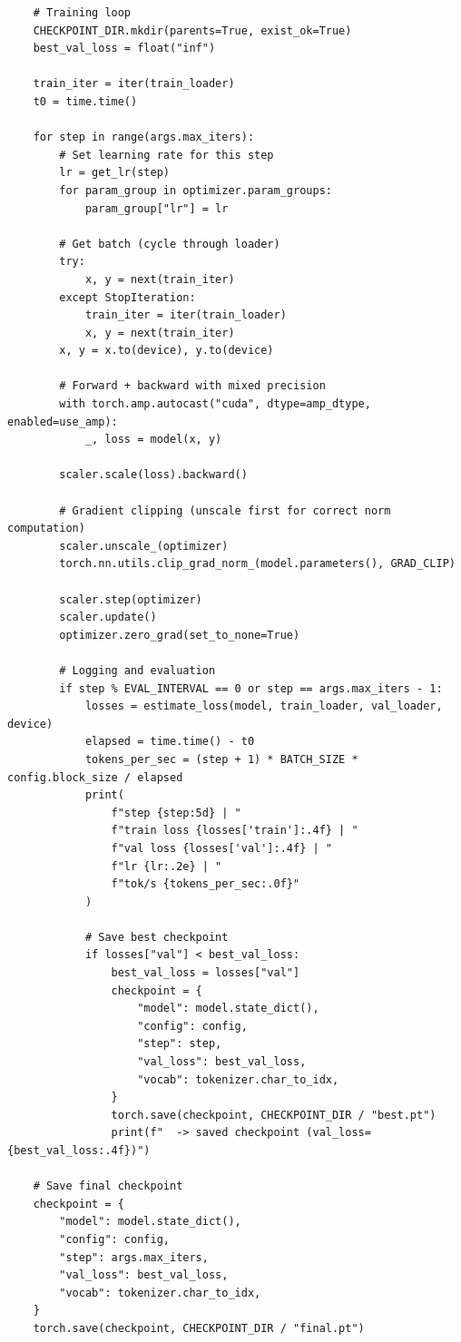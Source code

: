 \begin{lstlisting}
    # Training loop
    CHECKPOINT_DIR.mkdir(parents=True, exist_ok=True)
    best_val_loss = float("inf")

    train_iter = iter(train_loader)
    t0 = time.time()

    for step in range(args.max_iters):
        # Set learning rate for this step
        lr = get_lr(step)
        for param_group in optimizer.param_groups:
            param_group["lr"] = lr

        # Get batch (cycle through loader)
        try:
            x, y = next(train_iter)
        except StopIteration:
            train_iter = iter(train_loader)
            x, y = next(train_iter)
        x, y = x.to(device), y.to(device)

        # Forward + backward with mixed precision
        with torch.amp.autocast("cuda", dtype=amp_dtype, enabled=use_amp):
            _, loss = model(x, y)

        scaler.scale(loss).backward()

        # Gradient clipping (unscale first for correct norm computation)
        scaler.unscale_(optimizer)
        torch.nn.utils.clip_grad_norm_(model.parameters(), GRAD_CLIP)

        scaler.step(optimizer)
        scaler.update()
        optimizer.zero_grad(set_to_none=True)

        # Logging and evaluation
        if step % EVAL_INTERVAL == 0 or step == args.max_iters - 1:
            losses = estimate_loss(model, train_loader, val_loader, device)
            elapsed = time.time() - t0
            tokens_per_sec = (step + 1) * BATCH_SIZE * config.block_size / elapsed
            print(
                f"step {step:5d} | "
                f"train loss {losses['train']:.4f} | "
                f"val loss {losses['val']:.4f} | "
                f"lr {lr:.2e} | "
                f"tok/s {tokens_per_sec:.0f}"
            )

            # Save best checkpoint
            if losses["val"] < best_val_loss:
                best_val_loss = losses["val"]
                checkpoint = {
                    "model": model.state_dict(),
                    "config": config,
                    "step": step,
                    "val_loss": best_val_loss,
                    "vocab": tokenizer.char_to_idx,
                }
                torch.save(checkpoint, CHECKPOINT_DIR / "best.pt")
                print(f"  -> saved checkpoint (val_loss={best_val_loss:.4f})")

    # Save final checkpoint
    checkpoint = {
        "model": model.state_dict(),
        "config": config,
        "step": args.max_iters,
        "val_loss": best_val_loss,
        "vocab": tokenizer.char_to_idx,
    }
    torch.save(checkpoint, CHECKPOINT_DIR / "final.pt")


\end{lstlisting}
